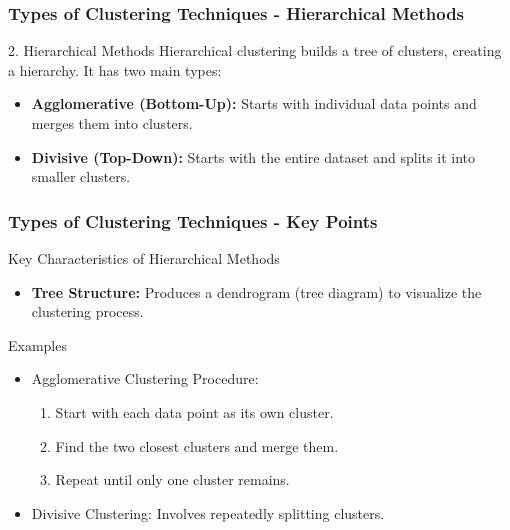 \documentclass[aspectratio=169]{beamer}
\begin{document}
\begin{frame}[fragile]
    \frametitle{Types of Clustering Techniques - Hierarchical Methods}
    \begin{block}{2. Hierarchical Methods}
    Hierarchical clustering builds a tree of clusters, creating a hierarchy. It has two main types:
    \end{block}
    
    \begin{itemize}
        \item \textbf{Agglomerative (Bottom-Up):} Starts with individual data points and merges them into clusters.
        \item \textbf{Divisive (Top-Down):} Starts with the entire dataset and splits it into smaller clusters.
    \end{itemize}
\end{frame}

\begin{frame}[fragile]
    \frametitle{Types of Clustering Techniques - Key Points}
    \begin{block}{Key Characteristics of Hierarchical Methods}
    \begin{itemize}
        \item \textbf{Tree Structure:} Produces a dendrogram (tree diagram) to visualize the clustering process.
    \end{itemize}
    \end{block}

    \begin{block}{Examples}
        \begin{itemize}
            \item Agglomerative Clustering Procedure:
            \begin{enumerate}
                \item Start with each data point as its own cluster.
                \item Find the two closest clusters and merge them.
                \item Repeat until only one cluster remains.
            \end{enumerate}
            \item Divisive Clustering: Involves repeatedly splitting clusters.
        \end{itemize}
    \end{block}
\end{frame}
\end{document}
